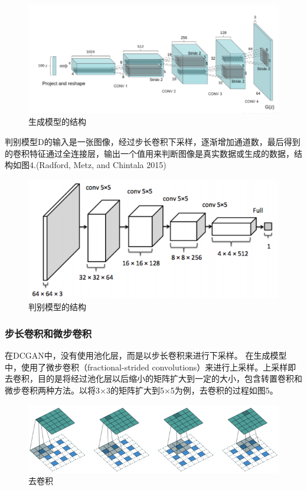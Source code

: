 \documentclass[hyperref, a4paper]{ctexart}
\begin{document}
\begin{figure}
\centering
\includegraphics{3.png}
\caption{生成模型的结构}
\end{figure}

判别模型D的输入是一张图像，经过步长卷积下采样，逐渐增加通道数，最后得到的卷积特征通过全连接层，输出一个值用来判断图像是真实数据或生成的数据，结构如图4.(Radford,
Metz, and Chintala 2015)

\begin{figure}
\centering
\includegraphics{4.png}
\caption{判别模型的结构}
\end{figure}

\hypertarget{ux6b65ux957fux5377ux79efux548cux5faeux6b65ux5377ux79ef}{%
\subsubsection{步长卷积和微步卷积}\label{ux6b65ux957fux5377ux79efux548cux5faeux6b65ux5377ux79ef}}

在DCGAN中，没有使用池化层，而是以步长卷积来进行下采样。
在生成模型中，使用了微步卷积（fractional-strided
convolutions）来进行上采样。上采样即去卷积，目的是将经过池化层以后缩小的矩阵扩大到一定的大小，包含转置卷积和微步卷积两种方法。以将3×3的矩阵扩大到5×5为例，去卷积的过程如图5。

\begin{figure}
\centering
\includegraphics{./5.png}
\caption{去卷积}
\end{figure}
\end{document}
